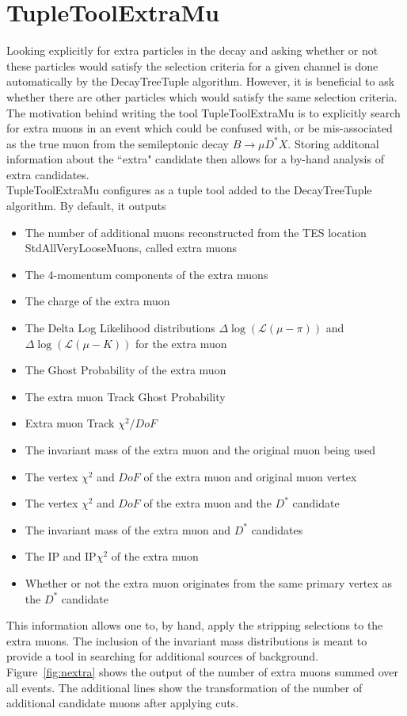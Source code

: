 \section{TupleToolExtraMu}
\label{sec:TupleToolExtraMu}
Looking explicitly for extra particles in the decay and asking whether or not these 
particles would satisfy the selection criteria for a given channel is done automatically 
by the DecayTreeTuple algorithm. However, it is beneficial to ask whether there are other 
particles which would satisfy the same selection criteria. The motivation behind writing 
the tool TupleToolExtraMu is to explicitly search for extra muons in an event which could 
be confused with, or be mis-associated as the true muon from the semileptonic decay 
$B\to \mu D^* X$. Storing additonal information about the ``extra" candidate then allows 
for a by-hand analysis of extra candidates.\\
TupleToolExtraMu configures as a tuple tool added to the DecayTreeTuple algorithm. By default, 
it outputs
\begin{itemize}
	\item The number of additional muons reconstructed from the TES location StdAllVeryLooseMuons, called extra muons
	\item The 4-momentum components of the extra muons
	\item The charge of the extra muon
	\item The Delta Log Likelihood distributions $\Delta \log( \mathcal{L}(\mu-\pi))$ and  $\Delta \log( \mathcal{L}(\mu-K))$ for the extra muon
	\item The Ghost Probability of the extra muon
	\item The extra muon Track Ghost Probability
	\item Extra muon Track $\chi^2/DoF$
	\item The invariant mass of the extra muon and the original muon being used
	\item The vertex $\chi^2$ and $DoF$ of the extra muon and original muon vertex
	\item The vertex $\chi^2$ and $DoF$ of the extra muon and the $D^*$ candidate
	\item The invariant mass of the extra muon and $D^*$ candidates
	\item The IP and IP$\chi^2$ of the extra muon
	\item Whether or not the extra muon originates from the same primary vertex as the $D^*$ candidate
\end{itemize}
This information allows one to, by hand, apply the stripping selections to the extra muons. 
The inclusion of the invariant mass distributions is meant to provide a tool in searching for 
additional sources of background. Figure~\ref{fig:nextra} shows the output of the number of 
extra muons summed over all events. The additional lines show the transformation of the number 
of additional candidate muons after applying cuts.

